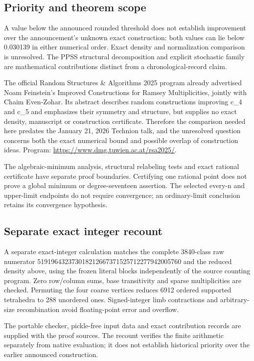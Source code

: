 \documentclass[11pt,a4paper]{article}
\begin{document}
\subsection{Priority and theorem scope}
A value below the announced rounded threshold does not establish improvement over the announcement's unknown exact construction: both values can lie below 0.030139 in either numerical order. Exact density and normalization comparison is unresolved. The PPSS structural decomposition and explicit stochastic family are mathematical contributions distinct from a chronological-record claim.

The official Random Structures \& Algorithms 2025 program already advertised Noam Feinstein's Improved Constructions for Ramsey Multiplicities, jointly with Chaim Even-Zohar. Its abstract describes random constructions improving c\_4 and c\_5 and emphasizes their symmetry and structure, but supplies no exact density, manuscript or construction certificate. Therefore the comparison needed here predates the January 21, 2026 Technion talk, and the unresolved question concerns both the exact numerical bound and possible overlap of construction ideas. Program: \url{https://www.dmg.tuwien.ac.at/rsa2025/}.

The algebraic-minimum analysis, structural relabeling tests and exact rational certificate have separate proof boundaries. Certifying one rational point does not prove a global minimum or degree-seventeen assertion. The selected every-n and upper-limit endpoints do not require convergence; an ordinary-limit conclusion retains its convergence hypothesis.

\subsection{Separate exact integer recount}
A separate exact-integer calculation matches the complete 3840-class raw numerator 519196432373018212667371525712277942005760 and the reduced density above, using the frozen literal blocks independently of the source counting program. Zero row/column sums, base transitivity and sparse multiplicities are checked. Permuting the four coarse vertices reduces 6912 ordered supported tetrahedra to 288 unordered ones. Signed-integer limb contractions and arbitrary-size recombination avoid floating-point error and overflow.

The portable checker, pickle-free input data and exact contribution records are supplied with the proof sources. The recount verifies the finite arithmetic separately from native evaluation; it does not establish historical priority over the earlier announced construction.
\end{document}

